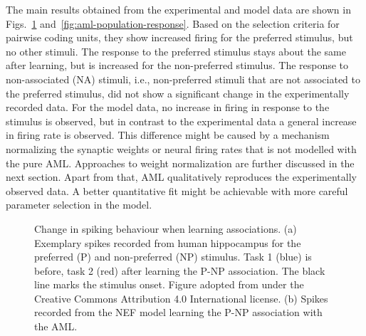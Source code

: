 The main results obtained from the experimental and model data are shown in Figs.~\ref{fig:aml-spikes} and~\ref{fig:aml-population-response}.
Based on the selection criteria for pairwise coding units, they show increased firing for the preferred stimulus, but no other stimuli.
The response to the preferred stimulus stays about the same after learning, but is increased for the non-preferred stimulus.
The response to non-associated (NA) stimuli, i.e., non-preferred stimuli that are not associated to the preferred stimulus, did not show a significant change in the experimentally recorded data.
For the model data, no increase in firing in response to the stimulus is observed, but in contrast to the experimental data a general increase in firing rate is observed.
This difference might be caused by a mechanism normalizing the synaptic weights or neural firing rates that is not modelled with the pure AML\@.
Approaches to weight normalization are further discussed in the next section.
Apart from that, AML qualitatively reproduces the experimentally observed data.
A better quantitative fit might be achievable with more careful parameter selection in the model.
\begin{figure}
    \centering

    \vspace*{0.34cm}
    \caption[Change in spiking behaviour when learning associations.]{Change in spiking behaviour when learning associations. (a) Exemplary spikes recorded from human hippocampus for the preferred (P) and non-preferred (NP) stimulus. Task 1 (blue) is before, task 2 (red) after learning the P-NP association. The black line marks the stimulus onset. Figure adopted from \textcite{ison2015} under the Creative Commons Attribution 4.0 International license. (b) Spikes recorded from the NEF model learning the P-NP association with the AML\@.}\label{fig:aml-spikes}
\end{figure}
